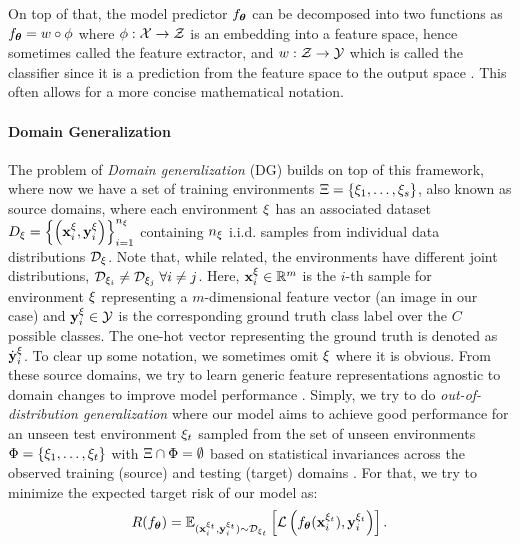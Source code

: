 On top of that, the model predictor $f_{\boldsymbol{\theta}}$ can be decomposed into two functions as $f_{\boldsymbol{\theta}} = w \circ \phi$ where $\phi: \mathcal{X} \rightarrow \mathcal{Z}$ is an embedding into a feature space, hence sometimes called the feature extractor, and $w: \mathcal{Z} \rightarrow \mathcal{Y}$ which is called the classifier since it is a prediction from the feature space to the output space \citep{gulrajani2020search, MotiianPAD17}. This often allows for a more concise mathematical notation.

\paragraph{Domain Generalization}
The problem of \emph{Domain generalization} (DG) builds on top of this framework, where now we have a set of training environments $\Xi = \left\{\xi_{1}, \ldots, \xi_{s} \right\}$, also known as source domains, where each environment $\xi$ has an associated dataset $D_{\xi}=\left\{\left(\mathbf{x}_i^{\xi}, \mathbf{y}_i^{\xi}\right)\right\}_{i=1}^{n_{\xi}}$ containing $n_\xi$ i.i.d. samples from individual data distributions $\mathcal{D}_\xi$. Note that, while related, the environments have different joint distributions, \ie $\mathcal{D}_{\xi_i}\neq \mathcal{D}_{\xi_j} \;\forall i\neq j$. Here, $\mathbf{x}_i^\xi \in \mathbb{R}^{m}$ is the $i$-th sample for environment $\xi$ representing a $m$-dimensional feature vector (\ie an image in our case) and $\mathbf{y}_i^\xi \in \mathcal{Y}$ is the corresponding ground truth class label over the $C$ possible classes. The one-hot vector representing the ground truth is denoted as $\dot{\mathbf{y}}_i^\xi$. To clear up some notation, we sometimes omit $\xi$ where it is obvious. From these source domains, we try to learn generic feature representations agnostic to domain changes to improve model performance \citep{seo2019learning}. Simply, we try to do \emph{out-of-distribution generalization} where our model aims to achieve good performance for an unseen test environment $\xi_t$ sampled from the set of unseen environments $\Phi = \left\{\xi_{1}, \ldots, \xi_{t}\right\}$ with $\Xi \cap \Phi =\emptyset$ based on statistical invariances across the observed training (source) and testing (target) domains \citep{gulrajani2020search, huang2020selfchallenging}. For that, we try to minimize the expected target risk of our model as:
\begin{equation}
\label{eq:domain_risk}
    R(f_{\boldsymbol{\theta}}) = \mathbb{E}_{(\mathbf{x}_i^{\xi_t}, \mathbf{y}_i^{\xi_t}) \sim \mathcal{D}_{\xi_t}}\left[\mathcal{L}\left(f_{\boldsymbol{\theta}}(\mathbf{x}_i^{\xi_t}), \mathbf{y}_i^{\xi_t}\right)\right].
\end{equation}
